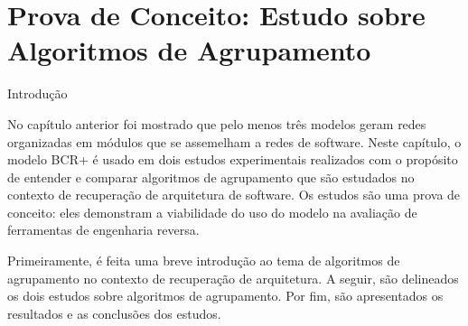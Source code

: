 
\chapter{Prova de Conceito: Estudo sobre Algoritmos de Agrupamento} \label{cap:estudo}


\begin{section}{Introdução}

No capítulo anterior foi mostrado que pelo menos três modelos geram redes organizadas em módulos que se assemelham a redes de software. Neste capítulo, o modelo BCR+ é usado em dois estudos experimentais realizados com o propósito de entender e comparar algoritmos de agrupamento que são estudados no contexto de recuperação de arquitetura de software. Os estudos são uma prova de conceito: eles demonstram a viabilidade do uso do modelo na avaliação de ferramentas de engenharia reversa.

Primeiramente, é feita uma breve introdução ao tema de algoritmos de agrupamento no contexto de recuperação de arquitetura. A seguir, são delineados os dois estudos sobre algoritmos de agrupamento. Por fim, são apresentados os resultados e as conclusões dos estudos.

\end{section}

